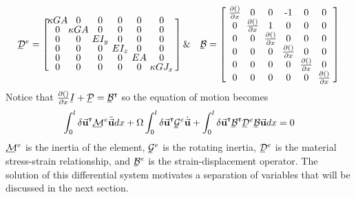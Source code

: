 \begin{equation}\label{key}
\def\cs{1.5em}
\bunderline{\mathcal{D}}^e=\left[\def\arraystretch{.8}\arraycolsep=1.8pt\begin{array}{cccccc}
\makebox[\cs]{$\kappa GA$}&\makebox[\cs]{0}&\makebox[\cs]{0}&\makebox[\cs]{0}&\makebox[\cs]{0}&\makebox[\cs]{0}\\
0&\kappa GA&0&0&0&0\\
0&0&EI_y&0&0&0\\
0&0&0&EI_z&0&0\\
0&0&0&0&EA&0\\
0&0&0&0&0&\kappa GJ_x
\end{array}\right] \&\quad \bunderline{\mathcal{B}}=\left[\def\arraystretch{.8}\arraycolsep=1.8pt\begin{array}{cccccc}
\makebox[\cs]{$\frac{\partial ()}{\partial x}$}&\makebox[\cs]{0}&\makebox[\cs]{0}&\makebox[\cs]{-1}&\makebox[\cs]{0}&\makebox[\cs]{0}\\
0&\frac{\partial ()}{\partial x}&1&0&0&0\\
0&0&\frac{\partial ()}{\partial x}&0&0&0\\
0&0&0&\frac{\partial ()}{\partial x}&0&0\\
0&0&0&0&\frac{\partial ()}{\partial x}&0\\
0&0&0&0&0&\frac{\partial ()}{\partial x}
\end{array}\right]
\end{equation}
Notice that $ \frac{\partial ()}{\partial x}\bunderline{I}+\bunderline{\mathcal{P}}=\bunderline{\mathcal{B}}^\T $ so the equation of motion becomes
\begin{equation}\label{eq:EquationOfMotionVirtual}
\int_0^l \delta\vec{\mathbf{u}}^\T\bunderline{\mathcal{M}}^e\ddot{\vec{\mathbf{u}}}dx+\Omega\int_0^l \delta\vec{\mathbf{u}}^\T\bunderline{\mathcal{G}}^e\dot{\vec{\mathbf{u}}}+\int_0^l\delta\vec{\mathbf{u}}^\T\bunderline{\mathcal{B}}^\T\bunderline{\mathcal{D}}^e\bunderline{\mathcal{B}}\vec{\mathbf{u}}dx=0
\end{equation}
$ \bunderline{\mathcal{M}}^e $ is the inertia of the element, $ \bunderline{\mathcal{G}}^e $ is the rotating inertia, $ \bunderline{\mathcal{D}}^e $ is the material stress-strain relationship, and $ \bunderline{\mathcal{B}}^e $ is the strain-displacement operator. The solution of this differential system motivates a separation of variables that will be discussed in the next section.
